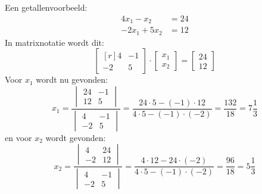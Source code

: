 \begin{example}
Een getallenvoorbeeld:
%
\begin{equation}
\begin{split}
4x_1 - x_2 &= 24 \\
-2x_1 + 5x_2 &= 12
\end{split}
\end{equation}
%
In matrixnotatie wordt dit:
\begin{equation}
\begin{bmatrix*}[r]
4 & -1 \\
-2 & 5
\end{bmatrix*} \cdot
\begin{bmatrix}
x_1 \\ x_2
\end{bmatrix} =
\begin{bmatrix}
24 \\ 12
\end{bmatrix}
\end{equation}
%
Voor $x_1$ wordt nu gevonden:
%
\begin{equation}
x_1 = \dfrac{\begin{vmatrix}
24 & -1 \\
12 & 5
\end{vmatrix}}{\begin{vmatrix}
4 & -1 \\
-2 & 5
\end{vmatrix}} = \dfrac{24\cdot5 - (-1)\cdot12}{4\cdot5 - (-1)\cdot(-2)} = \dfrac{132}{18} = 7\dfrac{1}{3}
\end{equation}
%
en voor $x_2$ wordt gevonden:
%
\begin{equation}
x_2 = \dfrac{\begin{vmatrix}
4 & 24 \\
-2 & 12
\end{vmatrix}}{\begin{vmatrix}
4 & -1 \\
-2 & 5
\end{vmatrix}} = \dfrac{4\cdot12-24\cdot(-2)}{4\cdot5 - (-1)\cdot(-2)} = \dfrac{96}{18} = 5\dfrac{1}{3}
\end{equation}
\end{example}

